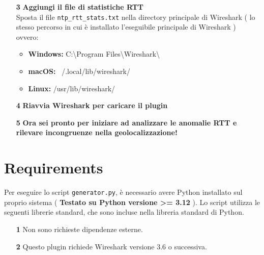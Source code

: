 \begin{enumerate}
  \item[\textbf{3}] \textbf{Aggiungi il file di statistiche RTT} \\
  Sposta il file \texttt{ntp\_rtt\_stats.txt} nella directory principale di Wireshark ( lo stesso percorso in cui è installato l'eseguibile principale di Wireshark ) ovvero:

  \begin{itemize}
    \item \textbf{Windows:} C:\textbackslash Program Files\textbackslash Wireshark\textbackslash
    \item \textbf{macOS:} ~/.local/lib/wireshark/
    \item \textbf{Linux:} /usr/lib/wireshark/
  \end{itemize}

  \item[\textbf{4}] \textbf{Riavvia Wireshark per caricare il plugin}
  
  \item[\textbf{5}] \textbf{Ora sei pronto per iniziare ad analizzare le anomalie RTT e rilevare incongruenze nella geolocalizzazione!}
\end{enumerate}

\section{Requirements}

Per eseguire lo script \texttt{generator.py}, è necessario avere Python installato sul proprio sistema ( \textbf{Testato su Python versione >= 3.12} ). Lo script utilizza le seguenti librerie standard, che sono incluse nella libreria standard di Python.\\
\begin{itemize}
    \item[\textbf{1}] Non sono richieste dipendenze esterne. 
    \item[\textbf{2}] Questo plugin richiede Wireshark versione 3.6 o successiva.
\end{itemize}
